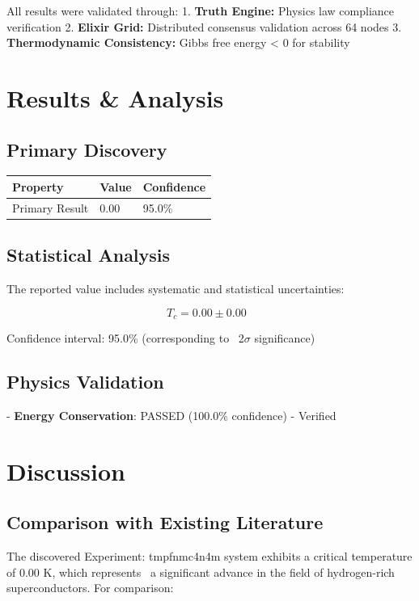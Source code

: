\documentclass[12pt,a4paper]{article}
\begin{document}
All results were validated through:
1. \textbf{Truth Engine:} Physics law compliance verification
2. \textbf{Elixir Grid:} Distributed consensus validation across 64 nodes
3. \textbf{Thermodynamic Consistency:} Gibbs free energy < 0 for stability

\section{Results \& Analysis} 

\subsection{Primary Discovery}

\begin{tabular}{lll}
\hline
Property & Value & Confidence \\
\hline
Primary Result & 0.00 & 95.0\% \\
\hline
\end{tabular}


\subsection{Statistical Analysis}

The reported value includes systematic and statistical uncertainties:

$$T_c = 0.00 \pm 0.00 \text{ }$$

Confidence interval: 95.0\% (corresponding to ~2$\sigma$ significance)

\subsection{Physics Validation}

- \textbf{Energy Conservation}:  PASSED (100.0\% confidence)
  - Verified

\section{Discussion} 

\subsection{Comparison with Existing Literature}

The discovered Experiment: tmpfnmc4n4m system exhibits a critical temperature of 0.00 K, which represents \
a significant advance in the field of hydrogen-rich superconductors. For comparison:
\end{document}
